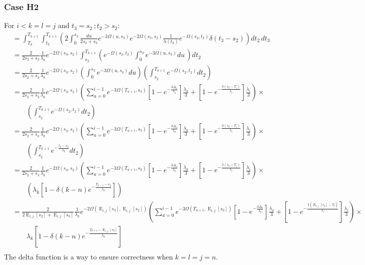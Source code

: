 \documentclass{article}
\DeclareMathOperator{\E}{E}
\begin{document}
\subsubsection{Case H2}
For $i<k=l=j$ and $t_3=s_2\,;t_2>s_2$:
\begin{align*}
    &=\int_{T_k}^{T_{k+1}}\int_{t_3}^{T_{k+1}}\left(2\int_0^{s_3}\frac{du}{2s_2+s_3}e^{-3\Omega(u,s_3)}e^{-2\Omega(s_3,s_2)}\frac{1}{\lambda(t_2)}e^{-\Omega(s_2,t_2)}\delta(t_3-s_2)\right)dt_2\,dt_3\\
    &=\frac{2}{2s_2+s_3}\frac{1}{\lambda_k}e^{-2\Omega(s_3,s_2)}\int_{s_2}^{T_{k+1}}\left(e^{-\Omega(s_2,t_2)}\int_0^{s_3}e^{-3\Omega(u,s_3)}du\,\right)dt_2\\
    &=\frac{2}{2s_2+s_3}\frac{1}{\lambda_k}e^{-2\Omega(s_3,s_2)}\left(\int_0^{s_3}e^{-3\Omega(u,s_3)}du\right)\left(\int_{s_2}^{T_{k+1}}e^{-\Omega(s_2,t_2)}dt_2\right)\\
    &=\frac{2}{2s_2+s_3}\frac{1}{\lambda_k}e^{-2\Omega(s_3,s_2)}\left(
    \sum_{a=0}^{i-1} e^{-3\Omega(T_{a+1},s_3)}
    \left[1-e^{-\frac{3 \Delta_a}{\lambda_a}}\right]\frac{\lambda_a}{3}+
    \left[1-e^{-\frac{3 \left(s_3-T_{i}\right)}{\lambda_{i}}}\right]\frac{\lambda_{i}}{3}
    \right)\times\\
    &\qquad\left(\int_{s_2}^{T_{k+1}}e^{-\Omega(s_2,t_2)}dt_2\right)\\
    &=\frac{2}{2s_2+s_3}\frac{1}{\lambda_k}e^{-2\Omega(s_3,s_2)}\left(
    \sum_{a=0}^{i-1} e^{-3\Omega(T_{a+1},s_3)}
    \left[1-e^{-\frac{3 \Delta_a}{\lambda_a}}\right]\frac{\lambda_a}{3}+
    \left[1-e^{-\frac{3 \left(s_3-T_{i}\right)}{\lambda_{i}}}\right]\frac{\lambda_{i}}{3}
    \right)\times\\
    &\qquad\left(
    \int_{s_2}^{T_{k+1}}e^{-\frac{t_2-s_2}{\lambda_k}}dt_2
    \right)\\
    &=\frac{2}{2s_2+s_3}\frac{1}{\lambda_k}e^{-2\Omega(s_3,s_2)}\left(
    \sum_{a=0}^{i-1} e^{-3\Omega(T_{a+1},s_3)}
    \left[1-e^{-\frac{3 \Delta_a}{\lambda_a}}\right]\frac{\lambda_a}{3}+
    \left[1-e^{-\frac{3 \left(s_3-T_{i}\right)}{\lambda_{i}}}\right]\frac{\lambda_{i}}{3}
    \right)\times\\
    &\qquad\left(
    \lambda_k\left[1-\delta(k-n)e^{-\frac{T_{k+1}-s_2}{\lambda_k}}\right]
    \right)\\
    &=\frac{2}{2\E_{i,j}[s_2]+\E_{i,j}[s_3]}\frac{1}{\lambda_k}e^{-2\Omega(\E_{i,j}[s_3],\E_{i,j}[s_2])}\left(
    \sum_{a=0}^{i-1} e^{-3\Omega(T_{a+1},\E_{i,j}[s_3])}
    \left[1-e^{-\frac{3 \Delta_a}{\lambda_a}}\right]\frac{\lambda_a}{3}+
    \left[1-e^{-\frac{3 \left(\E_{i,j}[s_3]-T_{i}\right)}{\lambda_{i}}}\right]\frac{\lambda_{i}}{3}
    \right)\times\\
    &\qquad
    \lambda_k\left[1-\delta(k-n)e^{-\frac{T_{k+1}-\E_{i,j}[s_2]}{\lambda_k}}\right]
    \\
\end{align*}
The delta function is a way to ensure correctness when $k=l=j=n$.
\end{document}
